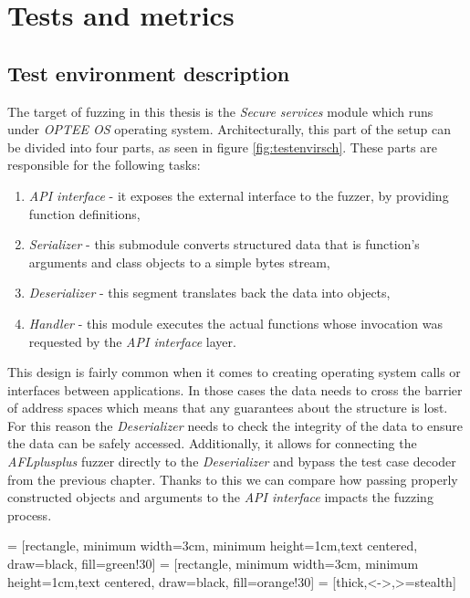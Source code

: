 \cleardoublepage
\section{Tests and metrics} \label{chap:tests}

\subsection{Test environment description}

The target of fuzzing in this thesis is the \textit{Secure services} module which runs under \textit{OPTEE OS} operating system. Architecturally, this part of the setup can be divided into four parts, as seen in figure \ref{fig:testenvirsch}. These parts are responsible for the following tasks:
\begin{enumerate}
    \item \textit{API interface} - it exposes the external interface to the fuzzer, by providing function definitions,
    \item \textit{Serializer} - this submodule converts structured data that is function's arguments and class objects to a simple bytes stream,
    \item \textit{Deserializer} - this segment translates back the data into objects,
    \item \textit{Handler} - this module executes the actual functions whose invocation was requested by the \textit{API interface} layer.
\end{enumerate}
This design is fairly common when it comes to creating operating system calls or interfaces between applications. In those cases the data needs to cross the barrier of address spaces which means that any guarantees about the structure is lost. For this reason the \textit{Deserializer} needs to check the integrity of the data to ensure the data can be safely accessed. Additionally, it allows for connecting the \textit{AFLplusplus} fuzzer directly to the \textit{Deserializer} and bypass the  test case decoder from the previous chapter. Thanks to this we can compare how passing properly constructed objects and arguments to the \textit{API interface} impacts the fuzzing process.

 = [rectangle, minimum width=3cm, minimum height=1cm,text centered, draw=black, fill=green!30]
 = [rectangle, minimum width=3cm, minimum height=1cm,text centered, draw=black, fill=orange!30]
 = [thick,<->,>=stealth]


